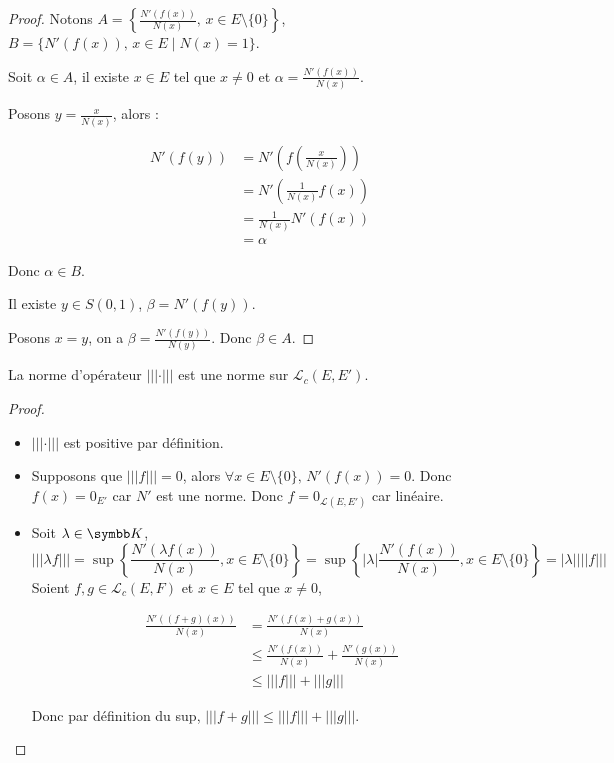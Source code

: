 \begin{proof}
    Notons $A = \left\{\frac{N'(f(x))}{N(x)}, \, x \in E \setminus \{0\}\right\}$,
    $B = \{N'(f(x)), \, x \in E \mid N(x) = 1\}$.

    Soit $\alpha \in A$, il existe $x \in E $ tel que $x \neq 0$ et $\alpha = \frac{N'(f(x))}{N(x)}$.

    Posons $y = \frac x {N(x)}$, alors : 

    \begin{align*}
        N'(f(y)) & = N'\left( f\left( \frac x {N(x)} \right) \right) \\
        & = N'\left( \frac{1}{N(x)} f(x) \right) \\
        & = \frac{1}{N(x)} N'(f(x)) \\
        & = \alpha
    \end{align*}

    Donc $\alpha \in B$. 

    Il existe $y \in S(0, 1)$, $\beta = N'(f(y))$. 

    Posons $x = y$, on a $\beta = \frac{N'(f(y))}{N(y)}$. 
    Donc $\beta \in A$.
\end{proof}

\begin{theoreme}{}{}
    La norme d'opérateur $|||\cdot|||$ est une norme sur $\mathscr L_c(E, E')$.
\end{theoreme}

\begin{proof}~
    \begin{itemize}
        \item $|||\cdot|||$ est positive par définition.
        \item Supposons que $|||f||| = 0$, alors $\forall x \in E \setminus \{0\}, \, N'(f(x)) = 0$.
            Donc $f(x) = 0_{E'}$ car $N'$ est une norme. Donc $f = 0_{\mathscr L(E, E')}$ car linéaire. 
        \item Soit $\lambda \in \K$,
        \[|||\lambda f||| = \sup \left\{ \frac{N'(\lambda f(x))}{N(x)}, x \in E \setminus \{0\} \right\} = \sup \left\{ |\lambda| \frac{N'(f(x))}{N(x)}, x \in E \setminus \{0\} \right\} = |\lambda| |||f|||\]
        Soient $f, g \in \mathscr L_c(E, F)$
        et $x \in E$ tel que $x \neq 0$,

        \begin{align*}
            \frac{N'((f + g)(x))}{N(x)} & = \frac{N'(f(x) + g(x))}{N(x)} \\
            & \leqslant \frac{N'(f(x)) }{N(x)} + \frac{N'(g(x))}{N(x)} \\
            & \leqslant |||f||| + |||g|||
        \end{align*}

        Donc par définition du sup, $|||f + g||| \leqslant |||f||| + |||g|||$.
    \end{itemize}
\end{proof}

